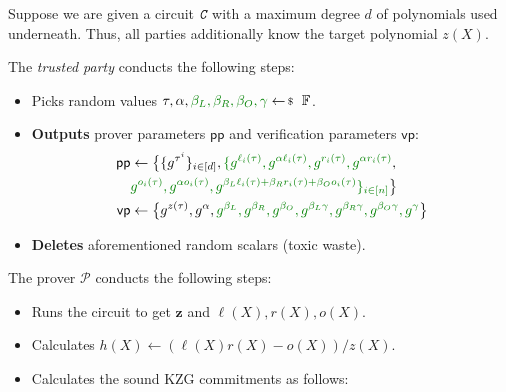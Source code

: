 \documentclass[../lecture-notes-148x210.tex]{subfiles}
\begin{document}
\begin{tcolorbox}[title=Attempt \#3: Sound SNARK Protocol,
    breakable,
    colback=blue!5!white,
    colframe=blue!75!black,
    colbacktitle=blue!25!white,
    coltitle=blue!20!black,
    fonttitle=\bfseries,
    boxrule=1.25pt,
    subtitle style={boxrule=0pt,
    colback=blue!20!white,
    colupper=blue!75!gray} ]

    Suppose we are given a circuit $\textit{\texttt{C}}$ with a maximum degree $d$ of polynomials used underneath. Thus, all parties additionally know the target polynomial $z(X)$.

    The \emph{trusted party} conducts the following steps:
    \begin{itemize}[label=]
        \item Picks random values $\tau, \alpha, \textcolor{green!50!black}{\beta_L, \beta_R, \beta_O, \gamma} \leftarrowS \mathbb{F}$.
        \item \textbf{Outputs} prover parameters $\mathsf{pp}$ and verification parameters $\mathsf{vp}$:
        \begin{align*}
            \mathsf{pp} &\gets \big\{\{g^{\tau^i}\}_{i \in [d]}, \textcolor{green!50!black}{\{g^{\ell_i(\tau)}, g^{\alpha \ell_i(\tau)}, g^{r_i(\tau)}, g^{\alpha r_i(\tau)}}, \\ 
            & \textcolor{green!50!black}{g^{o_i(\tau)}, g^{\alpha o_i(\tau)}, g^{\beta_L\ell_i(\tau)+\beta_Rr_i(\tau)+\beta_Oo_i(\tau)}\}_{i \in [n]}}\big\} \\
            \mathsf{vp} &\gets \big\{ g^{z(\tau)}, g^{\alpha}, \textcolor{green!50!black}{g^{\beta_L}, g^{\beta_R}, g^{\beta_O}, g^{\beta_L\gamma}, g^{\beta_R\gamma}, g^{\beta_O\gamma}, g^{\gamma}} \big\}
        \end{align*}
        \item \textbf{Deletes} aforementioned random scalars (toxic waste).
    \end{itemize}
    The prover $\mathcal{P}$ conducts the following steps:
    \begin{itemize}[label=]
        \item Runs the circuit to get $\mathbf{z}$ and $\ell(X),r(X),o(X)$.
        \item Calculates $h(X) \gets (\ell(X)r(X) - o(X))\big/ z(X)$.
        \item Calculates the sound KZG commitments as follows: 
        \begin{align*}

\end{align*}
\end{itemize}
\end{tcolorbox}
\end{document}
